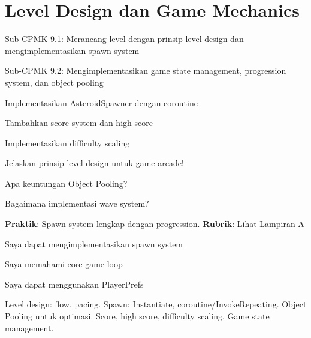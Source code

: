 \documentclass[../main]{subfiles}
\begin{document}
\chapter{Level Design dan Game Mechanics}

\begin{subcpmk}
  \item Sub-CPMK 9.1: Merancang level dengan prinsip level design dan mengimplementasikan spawn system
  \item Sub-CPMK 9.2: Mengimplementasikan game state management, progression system, dan object pooling
\end{subcpmk}




\begin{aktivitas}
  \item Implementasikan AsteroidSpawner dengan coroutine
  \item Tambahkan score system dan high score
  \item Implementasikan difficulty scaling
\end{aktivitas}

\begin{latihan}
  \item Jelaskan prinsip level design untuk game arcade!
  \item Apa keuntungan Object Pooling?
  \item Bagaimana implementasi wave system?
\end{latihan}

\begin{asesmen}
\textbf{Praktik}: Spawn system lengkap dengan progression.
\textbf{Rubrik}: Lihat Lampiran A
\end{asesmen}

\begin{checklist}
  \item Saya dapat mengimplementasikan spawn system
  \item Saya memahami core game loop
  \item Saya dapat menggunakan PlayerPrefs
\end{checklist}

\begin{rangkuman}
Level design: flow, pacing. Spawn: Instantiate, coroutine/InvokeRepeating. Object Pooling untuk optimasi. Score, high score, difficulty scaling. Game state management.
\end{rangkuman}

\ifSubfilesClassLoaded{
  \renewcommand{\bibname}{Daftar Pustaka}
  
  
}{}
\end{document}
